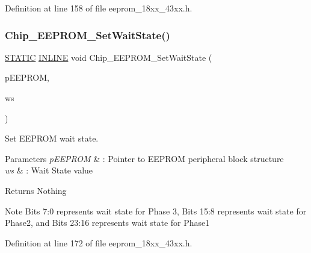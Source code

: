 Definition at line 158 of file eeprom\+\_\+18xx\+\_\+43xx.\+h.

\mbox{\label{group___e_e_p_r_o_m__18_x_x__43_x_x_ga2288ea4bc7ca2c7802c0880e5e347952}} 
\subsubsection{\texorpdfstring{Chip\+\_\+\+E\+E\+P\+R\+O\+M\+\_\+\+Set\+Wait\+State()}{Chip\_EEPROM\_SetWaitState()}}
{\footnotesize\ttfamily \hyperlink{group___l_p_c___types___public___macros_ga10b2d890d871e1489bb02b7e70d9bdfb}{S\+T\+A\+T\+IC} \hyperlink{spifi__18xx__43xx_8h_a2eb6f9e0395b47b8d5e3eeae4fe0c116}{I\+N\+L\+I\+NE} void Chip\+\_\+\+E\+E\+P\+R\+O\+M\+\_\+\+Set\+Wait\+State (\begin{DoxyParamCaption}\item[{\hyperlink{struct_l_p_c___e_e_p_r_o_m___t}{L\+P\+C\+\_\+\+E\+E\+P\+R\+O\+M\+\_\+T} $\ast$}]{p\+E\+E\+P\+R\+OM,  }\item[{uint32\+\_\+t}]{ws }\end{DoxyParamCaption})}



Set E\+E\+P\+R\+OM wait state. 


\begin{DoxyParams}{Parameters}
{\em p\+E\+E\+P\+R\+OM} & \+: Pointer to E\+E\+P\+R\+OM peripheral block structure \\
\hline
{\em ws} & \+: Wait State value \\
\hline
\end{DoxyParams}
\begin{DoxyReturn}{Returns}
Nothing 
\end{DoxyReturn}
\begin{DoxyNote}{Note}
Bits 7\+:0 represents wait state for Phase 3, Bits 15\+:8 represents wait state for Phase2, and Bits 23\+:16 represents wait state for Phase1 
\end{DoxyNote}


Definition at line 172 of file eeprom\+\_\+18xx\+\_\+43xx.\+h.


